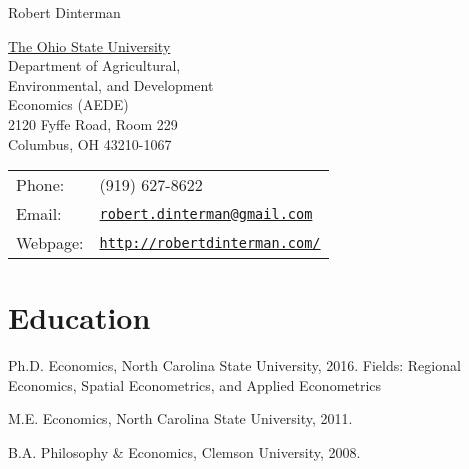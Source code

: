 \documentclass[letterpaper]{article}
\def\name{Robert Dinterman}
\renewenvironment{itemize}{
  \begin{list}{}{
    \setlength{\leftmargin}{1.5em}
  }
}{
  \end{list}
}
\begin{document}
{\huge \name}


\vspace{0.25in}

\begin{minipage}{0.45\linewidth}
  \href{http://aede.osu.edu/home}{The Ohio State University} \\
  Department of Agricultural, \\
  Environmental, and Development \\
  Economics (AEDE) \\
  2120 Fyffe Road, Room 229 \\
  Columbus, OH 43210-1067
\end{minipage}
\begin{minipage}{0.5\linewidth}
  \begin{tabular}{ll}
    Phone: & (919) 627-8622 \\
    Email: & \href{mailto:robert.dinterman@gmail.com}{\tt robert.dinterman@gmail.com} \\
    Webpage: & \href{http://robertdinterman.com/}{\tt http://robertdinterman.com/} \\
  \end{tabular}
\end{minipage}


% 
% 

\section*{Education}

\begin{itemize}
  \item Ph.D. Economics, North Carolina State University, 2016.
    \subitem Fields: Regional Economics, Spatial Econometrics, and Applied Econometrics

  \item M.E. Economics, North Carolina State University, 2011.

  \item B.A. Philosophy \& Economics, Clemson University, 2008.
\end{itemize}
\end{document}
